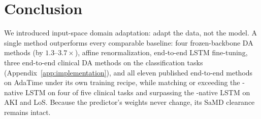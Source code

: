 
\section{Conclusion}
\label{sec:conclusion}

We introduced input-space domain adaptation: adapt the data, not the model. A single method outperforms every comparable baseline: four frozen-backbone DA methods (by $1.3$--$3.7\times$), affine renormalization, end-to-end LSTM fine-tuning, three end-to-end clinical DA methods on the classification tasks (Appendix~\ref{app:implementation}), and all eleven published end-to-end methods on AdaTime under its own training recipe, while matching or exceeding the \eicu{}-native LSTM on four of five clinical tasks and surpassing the \mimic{}-native LSTM on AKI and LoS.
Because the predictor's weights never change, its SaMD clearance~\citep{fda2021samd} remains intact.

